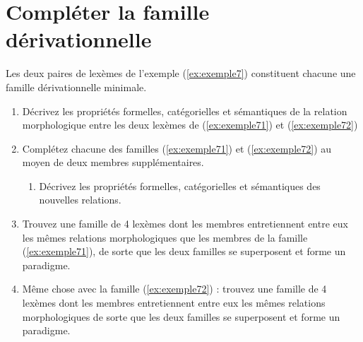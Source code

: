 

\section{Compléter la famille dérivationnelle}

Les deux paires de lexèmes de l'exemple (\ref{ex:exemple7})  constituent chacune une famille dérivationnelle minimale. \\

\vspace{-.5\baselineskip}
\begin{exe}
\ex \label{ex:exemple7}\begin{xlist}
\ex \label{ex:exemple71} \applicateurexsept
\ex \label{ex:exemple72} \contestataireexsept
\end{xlist}
\end{exe}



\begin{enumerate}
\item Décrivez les propriétés formelles, catégorielles et sémantiques de la relation morphologique entre les deux lexèmes de (\ref{ex:exemple71}) et (\ref{ex:exemple72}) 
\item Complétez chacune des familles (\ref{ex:exemple71}) et (\ref{ex:exemple72})  au moyen de deux membres supplémentaires.
\begin{enumerate}
\item Décrivez les propriétés formelles, catégorielles et sémantiques des nouvelles relations.
\end{enumerate}
\item Trouvez une famille de 4 lexèmes dont les membres entretiennent entre eux les mêmes relations morphologiques que les membres de la famille  (\ref{ex:exemple71}), de sorte que les deux familles se superposent et forme un paradigme.
\item Même chose avec la famille  (\ref{ex:exemple72}) : trouvez une famille de 4 lexèmes dont les membres entretiennent entre eux les mêmes relations morphologiques de sorte que les deux familles se superposent et forme un paradigme.
\end{enumerate}




